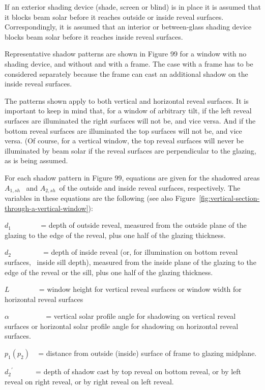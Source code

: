 If an exterior shading device (shade, screen or blind) is in place it is assumed that it blocks beam solar before it reaches outside or inside reveal surfaces. Correspondingly, it is assumed that an interior or between-glass shading device blocks beam solar before it reaches inside reveal surfaces.

Representative shadow patterns are shown in Figure 99 for a window with no shading device, and without and with a frame. The case with a frame has to be considered separately because the frame can cast an additional shadow on the inside reveal surfaces.

The patterns shown apply to both vertical and horizontal reveal surfaces. It is important to keep in mind that, for a window of arbitrary tilt, if the left reveal surfaces are illuminated the right surfaces will not be, and vice versa. And if the bottom reveal surfaces are illuminated the top surfaces will not be, and vice versa. (Of course, for a vertical window, the top reveal surfaces will never be illuminated by beam solar if the reveal surfaces are perpendicular to the glazing, as is being assumed.

For each shadow pattern in Figure 99, equations are given for the shadowed areas \({A_{1,sh}}\) ~and \emph{\({A_{2,sh}}\)}~of the outside and inside reveal surfaces, respectively. The variables in these equations are the following (see also Figure~\ref{fig:vertical-section-through-a-vertical-window}):

\({d_1}\) ~~~~~~~ = depth of outside reveal, measured from the outside plane of the glazing to the edge of the reveal, plus one half of the glazing thickness.

\({d_2}\) ~~ ~~~~~ = depth of inside reveal (or, for illumination on bottom reveal surfaces,~ inside sill depth), measured from the inside plane of the glazing to the edge of the reveal or the sill, plus one half of the glazing thickness.

\(L\) ~~~~~~~ = window height for vertical reveal surfaces or window width for horizontal reveal surfaces

\(\alpha\) ~~~~~~~~~ = vertical solar profile angle for shadowing on vertical reveal surfaces or horizontal solar profile angle for shadowing on horizontal reveal surfaces.

\({p_1}({p_2})\) ~ = distance from outside (inside) surface of frame to glazing midplane.

\({d_2}^\prime\) ~~~~~ = depth of shadow cast by top reveal on bottom reveal, or by left reveal on right reveal, or by right reveal on left reveal.

